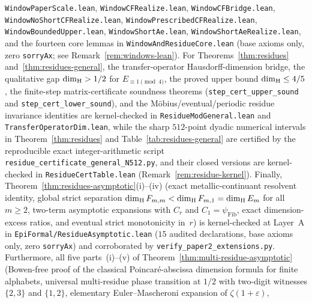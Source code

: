 \begin{itemize}[leftmargin=1.5em]
\texttt{Window\allowbreak Paper\allowbreak Scale.lean},
\texttt{Window\allowbreak CF\allowbreak Realize.lean},
\texttt{Window\allowbreak CF\allowbreak Bridge.lean},
\texttt{Window\allowbreak No\allowbreak Short\allowbreak CF\allowbreak Realize.lean},
\texttt{Window\allowbreak Prescribed\allowbreak CF\allowbreak Realize.lean},
\texttt{Window\allowbreak Bounded\allowbreak Upper.lean},
\texttt{Window\allowbreak Short\allowbreak Ae.lean},
\texttt{Window\allowbreak Short\allowbreak Ae\allowbreak Realize.lean}, and the fourteen
core lemmas in \texttt{Window\allowbreak And\allowbreak Residue\allowbreak Core.lean}
(base axioms only, zero \texttt{sorryAx}; see Remark~\ref{rem:windows-lean}).
For Theorems~\ref{thm:residues} and~\ref{thm:residues-general}, the
transfer-operator Hausdorff-dimension bridge, the qualitative gap
$\dim_{\mathrm{H}} > 1/2$ for $E_{\equiv 1\pmod 4}$, the proved upper bound
$\dim_{\mathrm{H}} \le 4/5$, the finite-step matrix-certificate soundness theorems
(\texttt{step\_\allowbreak cert\_\allowbreak upper\_\allowbreak sound} and
\texttt{step\_\allowbreak cert\_\allowbreak lower\_\allowbreak sound}), and
the M\"obius/eventual/periodic residue invariance identities are kernel-checked
in \texttt{Residue\allowbreak ModGeneral.lean} and
\texttt{Transfer\allowbreak Operator\allowbreak Dim.lean}, while the sharp
$512$-point dyadic numerical intervals in Theorem~\ref{thm:residues} and
Table~\ref{tab:residues-general} are certified by the reproducible exact
integer-arithmetic script \texttt{residue\_\allowbreak certificate\_\allowbreak general\_\allowbreak N512.py},
and their closed versions are kernel-checked in
\texttt{Residue\allowbreak Cert\allowbreak Table.lean} (Remark~\ref{rem:residue-kernel}). Finally,
Theorem~\ref{thm:residues-asymptotic}(i)--(iv) (exact metallic-continuant
resolvent identity, global strict separation $\dim_{\mathrm{H}} F_{m,m}<\dim_{\mathrm{H}} F_{m,1}=\dim_{\mathrm{H}} E_m$
for all $m\ge2$, two-term asymptotic expansions with $C_r$ and $C_1=\psi_{\mathrm{Fib}}$,
exact dimension-excess ratios, and eventual strict monotonicity in~$r$) is
kernel-checked at Layer~A in
\texttt{EpiFormal/\allowbreak Residue\allowbreak Asymptotic.lean} ($15$ audited
declarations, base axioms only, zero \texttt{sorryAx}) and corroborated by
\texttt{verify\_\allowbreak paper2\_\allowbreak extensions.py}. Furthermore,
all five parts~(i)--(v) of Theorem~\ref{thm:multi-residue-asymptotic}
(Bowen-free proof of the classical Poincar\'e-abscissa dimension formula for
finite alphabets, universal
multi-residue phase transition at $1/2$ with two-digit witnesses $\{2,3\}$
and $\{1,2\}$, elementary Euler--Mascheroni expansion of $\zeta(1+\varepsilon)$,

\end{itemize}
